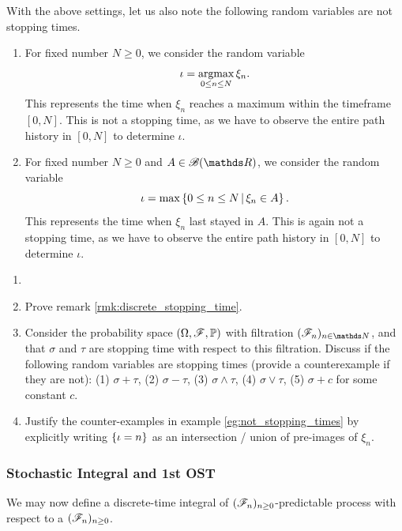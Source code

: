 \begin{example} \label{eg:not_stopping_times}
With the above settings, let us also note the following random variables are not stopping times.
\begin{enumerate}
    \item For fixed number $N\geq 0$, we consider the random variable
    \begin{equation*}
        \iota = \operatorname*{argmax}_{0 \leq n \leq N} \xi_n.
    \end{equation*}
    This represents the time when $\xi_n$ reaches a maximum within the timeframe $[0,N]$. This is not a stopping time, as we have to observe the entire path history in $[0,N]$ to determine $\iota$.
    \item For fixed number $N\geq 0$ and $A \in \B(\R)$, we consider the random variable
    \begin{equation*}
        \iota = \max \left\{ 0 \leq n \leq N \,|\, \xi_n \in A \right \}.
    \end{equation*}
    This represents the time when $\xi_n$ last stayed in $A$. This is again not a stopping time, as we have to observe the entire path history in $[0,N]$ to determine $\iota$.
\end{enumerate}
\end{example}

\begin{exercise}
\begin{enumerate}
    \item[]
    \item Prove remark \ref{rmk:discrete_stopping_time}.
    \item Consider the probability space $(\Omega,\mathcal{F},\mathbb{P})$ with filtration $(\F_n)_{n\in \N}$, and that $\sigma$ and $\tau$ are stopping time with respect to this filtration. Discuss if the following random variables are stopping times (provide a counterexample if they are not): (1) $\sigma + \tau$, (2) $\sigma - \tau$, (3) $\sigma \wedge \tau$, (4) $\sigma \vee \tau$, (5) $\sigma + c$ for some constant $c$.
    \item Justify the counter-examples in example \ref{eg:not_stopping_times} by explicitly writing $\left\{ \iota = n \right \}$ as an intersection / union of pre-images of $\xi_n$.
\end{enumerate}
\end{exercise}

\subsubsection{Stochastic Integral and 1st OST}
We may now define a discrete-time integral of $(\mathcal{F}_n)_{n\geq 0}$-predictable process with respect to a $(\mathcal{F}_n)_{n\geq 0}$.

